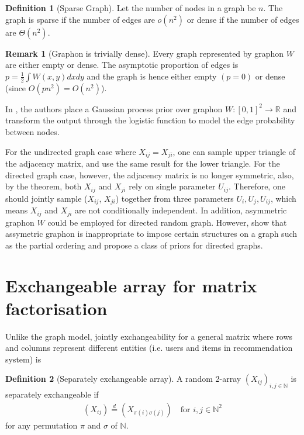 \documentclass{article}
\theoremstyle{definition}
\newtheorem{definition}{Definition}
\newtheorem{remark}{Remark}
\begin{document}
\begin{definition}[Sparse Graph]
Let the number of nodes in a graph be $n$. The graph is sparse if the number of edges are $o(n^2)$ or dense if the number of edges are $\Theta(n^2)$.
\end{definition}

\begin{remark}[Graphon is trivially dense]
Every graph represented by graphon $W$ are either empty or dense. The asymptotic proportion of edges is $p = \frac{1}{2}\int W(x, y) dxdy$ and the graph is hence either empty $(p=0)$ or dense (since $O(pn^2) = O(n^2)$).
\end{remark}

In \cite{Lloyd2013}, the authors place a Gaussian process prior over graphon $W:[0,1]^2 \rightarrow \mathbb{R}$ and transform the output through the logistic function to model the edge probability between nodes.

For the undirected graph case where $X_{ij} = X_{ji}$, one can sample upper triangle of the adjacency matrix, and use the same result for the lower triangle. For the directed graph case, however, the adjacency matrix is no longer symmetric, also, by the theorem, both $X_{ij}$ and $X_{ji}$ rely on single parameter $U_{ij}$. Therefore, one should jointly sample ($X_{ij}$, $X_{ji}$) together from three parameters $U_{i}, U_{j}, U_{ij}$, which means $X_{ij}$ and $X_{ji}$ are not conditionally independent. In addition, asymmetric graphon $W$ could be employed for directed random graph. However, \cite{Cai2015} show that assymetric graphon is inappropriate to impose certain structures on a graph such as the partial ordering and propose a class of priors for directed graphs.

\section{Exchangeable array for matrix factorisation}
Unlike the graph model, jointly exchangeability for a general matrix where rows and columns represent different entities (i.e. users and items in recommendation system) is

\begin{definition}[Separately exchangeable array]A random 2-array $(X_{ij})_{i,j\in \mathbb{N}}$ is separately exchangeable if
\begin{align}
(X_{ij}) \stackrel{d}{=} (X_{\pi(i)\sigma(j)}) \quad \text{for } i,j \in \mathbb{N}^2
\end{align}
for any permutation $\pi$ and $\sigma$ of $\mathbb{N}$.
\end{definition}
\end{document}
